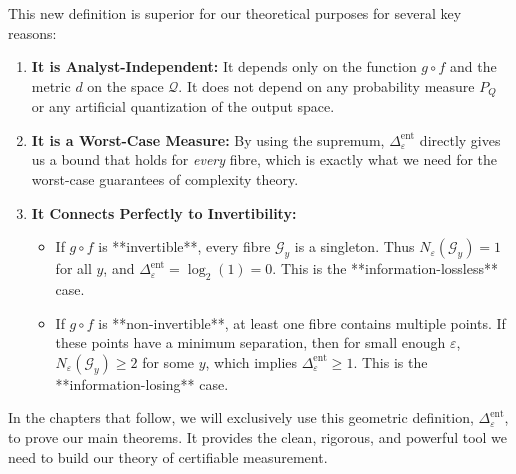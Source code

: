 \documentclass[12pt]{article}
\theoremstyle{definition}
\theoremstyle{plain}
\begin{document}
This new definition is superior for our theoretical purposes for several key reasons:
\begin{enumerate}
    \item \textbf{It is Analyst-Independent:} It depends only on the function $g \circ f$ and the metric $d$ on the space $\mathcal{Q}$. It does not depend on any probability measure $P_Q$ or any artificial quantization of the output space.
    \item \textbf{It is a Worst-Case Measure:} By using the supremum, $\Delta^{\text{ent}}_\varepsilon$ directly gives us a bound that holds for \emph{every} fibre, which is exactly what we need for the worst-case guarantees of complexity theory.
    \item \textbf{It Connects Perfectly to Invertibility:}
        \begin{itemize}
            \item If $g \circ f$ is **invertible**, every fibre $\mathcal{G}_y$ is a singleton. Thus $N_\varepsilon(\mathcal{G}_y) = 1$ for all $y$, and $\Delta^{\text{ent}}_\varepsilon = \log_2(1) = 0$. This is the **information-lossless** case.
            \item If $g \circ f$ is **non-invertible**, at least one fibre contains multiple points. If these points have a minimum separation, then for small enough $\varepsilon$, $N_\varepsilon(\mathcal{G}_y) \ge 2$ for some $y$, which implies $\Delta^{\text{ent}}_\varepsilon \ge 1$. This is the **information-losing** case.
        \end{itemize}
\end{enumerate}

In the chapters that follow, we will exclusively use this geometric definition, $\Delta^{\text{ent}}_\varepsilon$, to prove our main theorems. It provides the clean, rigorous, and powerful tool we need to build our theory of certifiable measurement.
\end{document}
